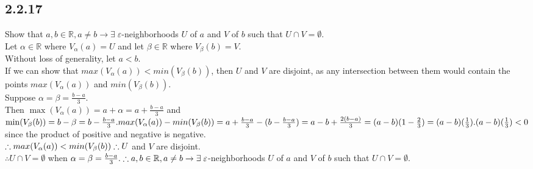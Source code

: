 \documentclass{article}
\begin{document}
\subsection{2.2.17}
Show that $a, b \in \mathbb{R}, a \neq b \rightarrow \exists \;
\varepsilon$-neighborhoods $U$ of $a$ and $V$ of $b$ such that $U \cap
V = \emptyset$.
\\Let $\alpha \in \mathbb{R}$ where $V_\alpha(a) = U$ and let $\beta \in
\mathbb{R}$ where $V_\beta(b) = V$.
\\Without loss of generality, let $a < b$.
\\If we can show that $max(V_\alpha(a)) < min(V_\beta(b))$, then $U$ and $V$
are disjoint, as any intersection between them would contain the points
$max(V_\alpha(a))$ and $min(V_\beta(b))$.
\\Suppose $\alpha = \beta = \frac{b-a}{3}$.
\\Then $\max(V_\alpha(a)) = a + \alpha = a + \frac{b-a}{3}$ and
$\min(V_\beta(b)) = b - \beta = b - \frac{b-a}{3}.
\\
\\max(V_\alpha(a)) - min(V_\beta(b)) =
a + \frac{b-a}{3} - (b - \frac{b-a}{3}) = 
a - b + \frac{2(b-a)}{3} = 
(a-b)(1 - \frac{2}{3}) =
(a-b)(\frac{1}{3}).
\\(a-b)(\frac{1}{3}) < 0$ since the product of positive and negative is
negative.
\\$\therefore max(V_\alpha(a)) < min(V_\beta(b))
\\\therefore U$ and $V$ are disjoint.
\\$\therefore U \cap V = \emptyset$ when $\alpha = \beta = \frac{b-a}{3}.
\\\therefore a, b \in \mathbb{R}, a \neq b \rightarrow \exists \;
\varepsilon$-neighborhoods $U$ of $a$ and $V$ of $b$ such that $U \cap
V = \emptyset$.
\end{document}
